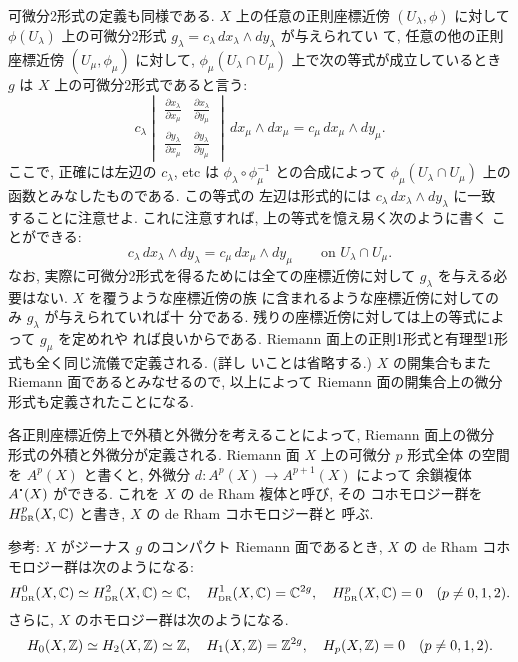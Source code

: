\documentclass[12pt,twoside]{jarticle}
\def\Hdr{H_{\text{\rm DR}}}
\def\bdot{{\raise0.4ex \hbox{\bf.}}}
\def\Hdr{H_{\text{\tiny DR}}}
\def\Z{{\Bbb Z}} %
\def\C{{\Bbb C}} %
\def\pd#1#2{\frac{\partial #1}{\partial #2}}
\begin{document}
可微分2形式の定義も同様である. %
$X$ 上の任意の正則座標近傍 $(U_\lambda,\phi)$ に対して %
$\phi(U_\lambda)$ 上の可微分2形式 %
$g_\lambda=c_\lambda\,dx_\lambda\wedge dy_\lambda$ が与えられてい
て, 任意の他の正則座標近傍 $(U_\mu,\phi_\mu)$ に対して, %
$\phi_\mu(U_\lambda\cap U_\mu)$ 上で次の等式が成立しているとき $g$ %
は $X$ 上の可微分2形式であると言う:
\[
  c_\lambda
  \begin{vmatrix}
    \pd{x_\lambda}{x_\mu} & \pd{x_\lambda}{y_\mu} \\ 
    \pd{y_\lambda}{x_\mu} & \pd{y_\lambda}{y_\mu}
  \end{vmatrix}
  \,dx_\mu\wedge dx_\mu
  = c_\mu\,dx_\mu\wedge dy_\mu.
\]
ここで, 正確には左辺の $c_\lambda$, etc は %
$\phi_\lambda\circ\phi_\mu^{-1}$ との合成によって %
$\phi_\mu(U_\lambda\cap U_\mu)$ 上の函数とみなしたものである. この等式の
左辺は形式的には $c_\lambda\,dx_\lambda\wedge dy_\lambda$ に一致
することに注意せよ. これに注意すれば, 上の等式を憶え易く次のように書く
ことができる:
\[
    c_\lambda\,dx_\lambda\wedge dy_\lambda
  = c_\mu\,dx_\mu\wedge dy_\mu
  \qquad
  \text{on $U_\lambda\cap U_\mu$.}
\]
なお, 実際に可微分2形式を得るためには全ての座標近傍に対して %
$g_\lambda$ を与える必要はない. $X$ を覆うような座標近傍の族
に含まれるような座標近傍に対してのみ $g_\lambda$ が与えられていれば十
分である. 残りの座標近傍に対しては上の等式によって $g_\mu$ を定めれや
れば良いからである. %
Riemann 面上の正則1形式と有理型1形式も全く同じ流儀で定義される. (詳し
いことは省略する.) $X$ の開集合もまた Riemann 面であるとみなせるので, 
以上によって Riemann 面の開集合上の微分形式も定義されたことになる.

各正則座標近傍上で外積と外微分を考えることによって, Riemann 面上の微分
形式の外積と外微分が定義される. Riemann 面 $X$ 上の可微分 $p$ 形式全体
の空間を $A^p(X)$ と書くと, 外微分 $d : A^p(X)\to A^{p+1}(X)$ によって
余鎖複体 $A^\bdot(X)$ ができる. これを $X$ の de Rham 複体と呼び, その
コホモロジー群を $\Hdr^p(X,\C)$ と書き, $X$ の de Rham コホモロジー群と
呼ぶ. 

\medskip

\noindent 参考: $X$ がジーナス $g$ のコンパクト Riemann 面であるとき, %
$X$ の de Rham コホモロジー群は次のようになる:
\[
  \Hdr^0(X,\C)\simeq \Hdr^2(X,\C) \simeq \C,
  \quad
  \Hdr^1(X,\C)=\C^{2g},
  \quad
  \Hdr^p(X,\C)=0 \quad (p\ne0,1,2).
\]
さらに, $X$ のホモロジー群は次のようになる.
\[
  H_0(X,\Z)\simeq H_2(X,\Z) \simeq \Z,
  \quad
  H_1(X,\Z)=\Z^{2g},
  \quad
  H_p(X,\Z)=0 \quad (p\ne0,1,2).
\]

\medskip
\end{document}
